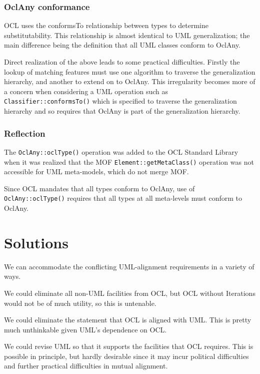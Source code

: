 \documentclass{eceasst}
\begin{document}
\subsubsection{OclAny conformance}

OCL uses the conformsTo relationship between types to determine substitutability. This relationship is almost identical to UML generalization; the main difference being the definition that all UML classes conform to OclAny.

Direct realization of the above leads to some practical difficulties. Firstly the lookup of matching features must use one algorithm to traverse the generalization hierarchy, and another to extend on to OclAny. This irregularity becomes more of a concern when considering a UML operation such as \verb|Classifier::conformsTo()| which is specified to traverse the generalization hierarchy and so requires that OclAny is part of the generalization hierarchy.

\subsubsection{Reflection}

The \verb|OclAny::oclType()| operation was added to the OCL Standard Library when it was realized that the MOF \verb|Element::getMetaClass()| operation was not accessible for UML meta-models, which do not merge MOF.

Since OCL mandates that all types conform to OclAny, use of \verb|OclAny::oclType()| requires that all types at all meta-levels must conform to OclAny.   

\section{Solutions}\label{Solutions}

We can accommodate the conflicting UML-alignment requirements in a variety of ways.

We could eliminate all non-UML facilities from OCL, but OCL without Iterations would not be of much utility, so this is untenable.

We could eliminate the statement that OCL is aligned with UML. This is pretty much unthinkable given UML's dependence on OCL.

We could revise UML so that it supports the facilities that OCL requires. This is possible in principle, but hardly desirable since it may incur political difficulties and further practical difficulties in mutual alignment.
\end{document}
